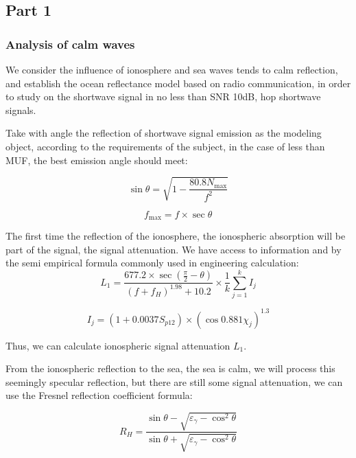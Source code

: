 \documentclass{mcmthesis}
\begin{document}
\subsection{Part 1}
\subsubsection{Analysis of calm waves}


We consider the influence of ionosphere and sea waves tends to calm reflection, and establish the ocean reflectance model based on radio communication, in order to study on the shortwave signal in no less than SNR 10dB, hop shortwave signals.

Take with angle   the reflection of shortwave signal emission as the modeling object, according to the requirements of the subject, in the case of less than MUF, the best emission angle should meet:

\begin{equation} \label{1}
\sin \theta  = \sqrt {1 - \frac{{80.8{N_{\max }}}}{{{f^2}}}}
\end{equation}



\begin{equation} \label{2}
{f_{\max }} = f \times \sec {\theta _{}}
\end{equation}

The first time the reflection of the ionosphere, the ionospheric absorption will be part of the signal, the signal attenuation. We have access to information and by the semi empirical formula commonly used in engineering calculation:%
\begin{equation} \label{3}
{L_1} = \frac{{677.2 \times \sec (\frac{\pi }{2} - \theta )}}{{{{(f + {f_H})}^{1.98}} + 10.2}} \times \frac{1}{k}\sum\limits_{j = 1}^k {{I_j}}
\end{equation}

\begin{equation} \label{4}
{I_j} = (1 + 0.0037{S_{p12}}) \times {(\cos 0.881{\chi _j})^{1.3}}
\end{equation}

Thus, we can calculate ionospheric signal attenuation $L_1$.


From the ionospheric reflection to the sea, the sea is calm, we will process this seemingly specular reflection, but there are still some signal attenuation, we can use the Fresnel reflection coefficient formula:

\begin{equation} \label{5}
{R_H} = \frac{{\sin \theta  - \sqrt {{\varepsilon _\gamma } - {{\cos }^2}\theta } }}{{\sin \theta  + \sqrt {{\varepsilon _\gamma } - {{\cos }^2}\theta } }}
\end{equation}
\end{document}
